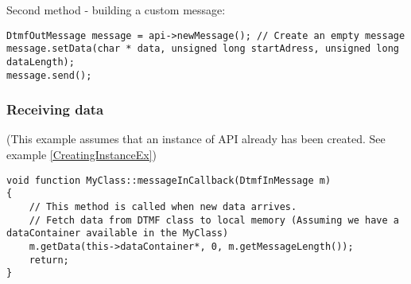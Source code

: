Second method - building a custom message:
\begin{lstlisting}[caption={Sending data example 2},label=SendingDataEx2]
DtmfOutMessage message = api->newMessage(); // Create an empty message
message.setData(char * data, unsigned long startAdress, unsigned long dataLength);
message.send();
\end{lstlisting}


\subsubsection{Receiving data}
(This example assumes that an instance of API already has been created. See example \ref{CreatingInstanceEx})
\begin{lstlisting}[caption={Receiving data example},label=ReceivingDataEx]
void function MyClass::messageInCallback(DtmfInMessage m)
{
    // This method is called when new data arrives.
    // Fetch data from DTMF class to local memory (Assuming we have a dataContainer available in the MyClass)
    m.getData(this->dataContainer*, 0, m.getMessageLength());
    return;
}
\end{lstlisting}


